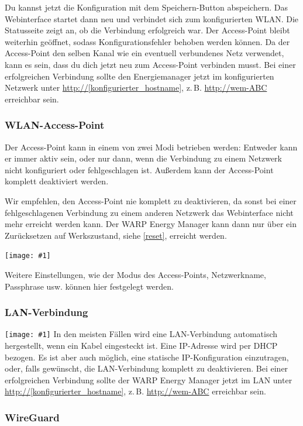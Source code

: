 \documentclass[a4paper,10pt]{article}
\newcommand{\hint}[1]{\begin{tcolorbox}[colback=boxgray,colframe=black,coltext=
white,title=Hinweis,left*=2mm,right*=2mm,boxsep=1mm,bottom=1mm,top=1mm]#1\end{tcolorbox}}
\newcommand{\gfx}[1]{\texttt{[image: \#1]}}
\begin{document}
\begin{multicols*}{2}
	Du kannst jetzt die Konfiguration mit dem Speichern-Button abspeichern.
	Das Webinterface startet dann neu und verbindet sich zum konfigurierten WLAN. Die Statusseite zeigt
	an, ob die Verbindung erfolgreich war. Der Access-Point bleibt weiterhin
	geöffnet, sodass Konfigurationsfehler behoben werden können.
	Da der Access-Point den selben Kanal wie ein eventuell verbundenes Netz verwendet,
	kann es sein, dass du dich jetzt neu zum Access-Point verbinden musst. Bei einer erfolgreichen Verbindung sollte den Energiemanager jetzt im konfigurierten Netzwerk unter
	\url{http://[konfigurierter_hostname]}, z.\,B. \url{http://wem-ABC} erreichbar sein.

	\subsubsection{WLAN-Access-Point}

	Der Access-Point kann in einem von zwei Modi betrieben werden: Entweder kann er immer aktiv sein,
	oder nur dann, wenn die Verbindung zu einem Netzwerk nicht konfiguriert oder fehlgeschlagen ist.
	Außerdem kann der Access-Point komplett deaktiviert werden.

	\hint{Wir empfehlen, den Access-Point nie komplett zu deaktivieren, da sonst bei einer
		fehlgeschlagenen Verbindung zu einem anderen Netzwerk das Webinterface nicht mehr erreicht
		werden kann. Der WARP Energy Manager kann dann nur über ein Zurücksetzen auf Werkszustand, siehe \ref{reset}, erreicht werden.}

	\gfx{./img/resized/web_wifi_ap}


	Weitere Einstellungen, wie der Modus des Access-Points,
	Netzwerkname, Passphrase usw. können hier festgelegt werden.

	\subsubsection{LAN-Verbindung}
	\gfx{./img/resized/web_ethernet}
	In den meisten Fällen wird eine
	LAN-Verbindung automatisch hergestellt, wenn ein Kabel eingesteckt ist.
	Eine IP-Adresse wird per DHCP bezogen. Es ist aber auch möglich,
	eine statische IP-Konfiguration	einzutragen, oder, falls gewünscht, die LAN-Verbindung
	komplett zu deaktivieren.
	Bei einer erfolgreichen Verbindung sollte der WARP Energy Manager jetzt im LAN unter
	\url{http://[konfigurierter_hostname]}, z.\,B. \url{http://wem-ABC} erreichbar sein.

	\subsubsection{WireGuard}


\end{multicols*}
\end{document}
